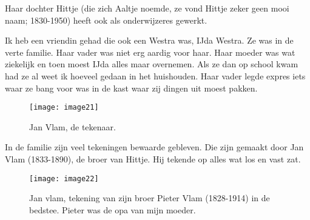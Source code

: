 Haar dochter Hittje (die zich Aaltje noemde, ze vond Hittje zeker geen mooi naam; 1830-1950) heeft ook als onderwijzeres gewerkt.

Ik heb een vriendin gehad die ook een Westra was, IJda Westra. Ze was in de verte familie. Haar vader was niet erg aardig voor haar. Haar moeder was wat ziekelijk en toen moest IJda alles maar overnemen. Als ze dan op school kwam had ze al weet ik hoeveel gedaan in het huishouden. Haar vader legde expres iets waar ze bang voor was in de kast waar zij dingen uit moest pakken.

\begin{figure}[h]
    \begin{centering}
    \texttt{[image: image21]}
    \caption{Jan Vlam, de tekenaar.}
    \end{centering}
\end{figure}

In de familie zijn veel tekeningen bewaarde gebleven. Die zijn gemaakt door Jan Vlam (1833-1890), de broer van Hittje. Hij tekende op alles wat los en vast zat.

\begin{figure}[h]
    \texttt{[image: image22]}
    \caption{Jan vlam, tekening van zijn broer Pieter Vlam (1828-1914) in de bedstee. Pieter was de opa van mijn moeder.}
\end{figure}
